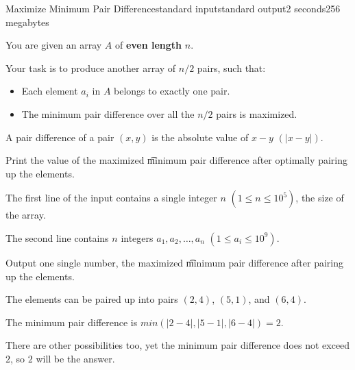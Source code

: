 \begin{problem}{Maximize Minimum Pair Difference}{standard input}{standard output}{2 seconds}{256 megabytes}

You are given an array $A$ of \textbf{even length} $n$.

Your task is to produce another array of $n/2$ pairs, such that:

\begin{itemize}
  \item Each element $a_i$ in $A$ belongs to exactly one pair.
  \item The minimum pair difference over all the $n/2$ pairs is maximized. 
\end{itemize}

A pair difference of a pair $(x, y)$ is the absolute value of $x-y$ $(|x-y|)$.

Print the value of the maximized \t{minimum pair difference} after optimally pairing up the elements.

\InputFile
The first line of the input contains a single integer $n$ $(1 \leq n \leq 10^5)$, the size of the array.

The second line contains $n$ integers $a_1, a_2, \dots, a_n$ $(1\leq a_i \leq 10^9)$.

\OutputFile
Output one single number, the maximized \t{minimum pair difference} after pairing up the elements.

\Example

\begin{example}
%
\end{example}

\Note
The elements can be paired up into pairs $(2,4)$, $(5,1)$, and $(6,4)$.

The minimum pair difference is $min(|2-4|, |5-1|, |6-4|) = 2$.

There are other possibilities too, yet the minimum pair difference does not exceed $2$, so $2$ will be the answer.

\end{problem}

